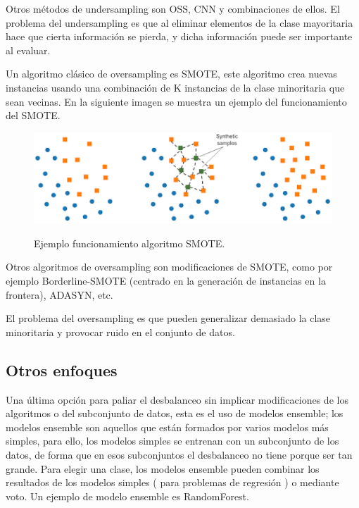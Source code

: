Otros métodos de undersampling son OSS, CNN y combinaciones de ellos. El problema del undersampling es que al eliminar elementos de la clase mayoritaria hace que cierta información se pierda, y dicha información puede ser importante al evaluar.\newline

Un algoritmo clásico de oversampling es SMOTE, este algoritmo crea nuevas instancias usando una combinación de K instancias de la clase minoritaria que sean vecinas. En la siguiente imagen se muestra un ejemplo del funcionamiento del SMOTE.\newline

\begin{figure}[h]
	\centering
	\includegraphics[width=120mm]{imagenes/smote-example.png}
	\label{fig:29}
	\caption{Ejemplo funcionamiento algoritmo SMOTE.}
\end{figure}
\verticalspace

Otros algoritmos de oversampling son modificaciones de SMOTE, como por ejemplo Borderline-SMOTE (centrado en la generación de instancias en la frontera), ADASYN, etc.\newline

El problema del oversampling es que pueden generalizar demasiado la clase minoritaria y provocar ruido en el conjunto de datos.

\subsection{Otros enfoques}
Una última opción para paliar el desbalanceo sin implicar modificaciones de los algoritmos o del subconjunto de datos, esta es el uso de modelos ensemble; los modelos ensemble son aquellos que están formados por varios modelos más simples, para ello, los modelos simples se entrenan con un subconjunto de los datos, de forma que en esos subconjuntos el desbalanceo no tiene porque ser tan grande. Para elegir una clase, los modelos ensemble pueden combinar los resultados de los modelos simples ( para problemas de regresión ) o mediante voto. Un ejemplo de modelo ensemble es RandomForest.